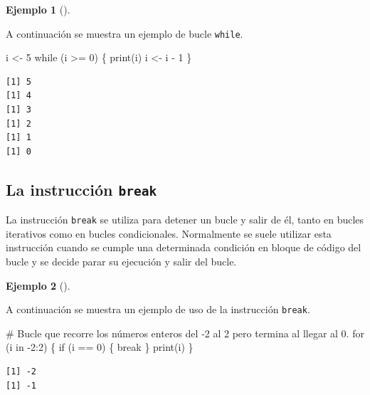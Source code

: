 \documentclass[
  a4paper,
]{scrreport}
\newenvironment{Shaded}{\begin{snugshade}}{\end{snugshade}}
\newcommand{\CommentTok}[1]{\textcolor[rgb]{0.37,0.37,0.37}{#1}}
\newcommand{\ControlFlowTok}[1]{\textcolor[rgb]{0.00,0.23,0.31}{#1}}
\newcommand{\DecValTok}[1]{\textcolor[rgb]{0.68,0.00,0.00}{#1}}
\newcommand{\FunctionTok}[1]{\textcolor[rgb]{0.28,0.35,0.67}{#1}}
\newcommand{\NormalTok}[1]{\textcolor[rgb]{0.00,0.23,0.31}{#1}}
\newcommand{\OtherTok}[1]{\textcolor[rgb]{0.00,0.23,0.31}{#1}}
\newcommand{\SpecialCharTok}[1]{\textcolor[rgb]{0.37,0.37,0.37}{#1}}
\theoremstyle{definition}
\newtheorem{example}{Ejemplo}[chapter]
\theoremstyle{definition}
\theoremstyle{remark}
\begin{document}
\leavevmode{}%
\begin{example}[]\label{exm-bucle-condicional}

A continuación se muestra un ejemplo de bucle \texttt{while}.

\begin{Shaded}
\begin{Highlighting}[]
\NormalTok{i }\OtherTok{\textless{}{-}} \DecValTok{5}
\ControlFlowTok{while}\NormalTok{ (i }\SpecialCharTok{\textgreater{}=} \DecValTok{0}\NormalTok{) \{}
  \FunctionTok{print}\NormalTok{(i)}
\NormalTok{  i }\OtherTok{\textless{}{-}}\NormalTok{ i }\SpecialCharTok{{-}} \DecValTok{1}
\NormalTok{\}}
\end{Highlighting}
\end{Shaded}

\begin{verbatim}
[1] 5
[1] 4
[1] 3
[1] 2
[1] 1
[1] 0
\end{verbatim}

\end{example}

\hypertarget{la-instrucciuxf3n-break}{%
\subsection{\texorpdfstring{La instrucción
\texttt{break}}{La instrucción break}}\label{la-instrucciuxf3n-break}}

La instrucción \texttt{break} se utiliza para detener un bucle y salir
de él, tanto en bucles iterativos como en bucles condicionales.
Normalmente se suele utilizar esta instrucción cuando se cumple una
determinada condición en bloque de código del bucle y se decide parar su
ejecución y salir del bucle.

\leavevmode{}%
\begin{example}[]\label{exm-salida-bucle-break}

A continuación se muestra un ejemplo de uso de la instrucción
\texttt{break}.

\begin{Shaded}
\begin{Highlighting}[]
\CommentTok{\# Bucle que recorre los números enteros del {-}2 al 2 pero termina al llegar al 0.}
\ControlFlowTok{for}\NormalTok{ (i }\ControlFlowTok{in} \SpecialCharTok{{-}}\DecValTok{2}\SpecialCharTok{:}\DecValTok{2}\NormalTok{) \{}
  \ControlFlowTok{if}\NormalTok{ (i }\SpecialCharTok{==} \DecValTok{0}\NormalTok{) \{}
    \ControlFlowTok{break}
\NormalTok{  \} }
  \FunctionTok{print}\NormalTok{(i)}
\NormalTok{\}}
\end{Highlighting}
\end{Shaded}

\begin{verbatim}
[1] -2
[1] -1
\end{verbatim}

\end{example}
\end{document}
